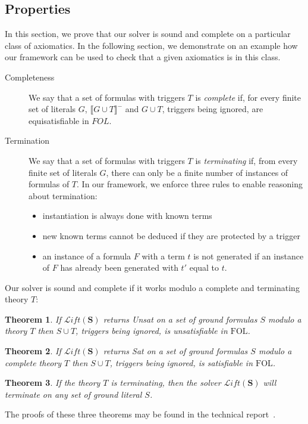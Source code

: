 \documentclass[]{easychair}
\newcommand{\Fm}[1]{\llb #1 \rrb^-}
\newcommand{\Lift}{{\mathcal{L}\mathit{ift}(\mathbf{S})}}
\newcommand{\FOL}{\mathrm{FOL}}
\newcommand{\llb}{\llbracket} \newcommand{\rrb}{\rrbracket}
\newcommand{\beforesub}{\vspace{0cm}}
\newcommand{\aftersub}{\vspace{0cm}}
\newtheorem{theorem}{Theorem}[section]
\begin{document}
\beforesub
\subsection{Properties}
\aftersub

In this section, we prove that our solver is sound and complete on a particular
class of axiomatics. In the following section, we demonstrate on an example how
our framework can be used to check that a given axiomatics is in this class.
\begin{description}
\item[Completeness] We say that a set of formulas with triggers $T$ is
\emph{complete} if, for every finite set of literals $G$,
$\Fm{G\cup T}$ and  $G\cup T$, triggers being ignored, are equisatisfiable in
$FOL$.
\item[Termination] We say that a set of formulas with triggers $T$ is
\emph{terminating} if, from every finite set of literals $G$,
there can only be a finite number of instances of formulas of $T$. In our
framework, we enforce three rules to enable reasoning about termination:
\begin{itemize}
 \item instantiation is always done with known terms
 \item new known terms cannot be deduced if they are protected by a trigger
 \item an instance of a formula $F$ with a term $t$ is not generated if an
instance of $F$ has already been generated with $t'$ equal to $t$.
\end{itemize}
\end{description}
Our solver is sound and complete if it works modulo a complete and terminating
theory $T$:
\begin{theorem} \label{unsat}
If $\Lift$ returns \emph{Unsat} on a set of ground
formulas $S$ modulo a theory $T$ then $S\cup T$, triggers being
ignored, is unsatisfiable in $\FOL$.
\end{theorem}
\begin{theorem} \label{sat}
If $\Lift$ returns \emph{Sat} on a set of ground
formulas $S$ modulo a complete theory $T$ then $S\cup T$, triggers being
ignored, is satisfiable in $\FOL$.
\end{theorem}
\begin{theorem} \label{termination}
If the theory $T$ is terminating, then the solver $\Lift$ will terminate on
any set of ground literal $S$.
\end{theorem}
The proofs of these three theorems may be found in the technical
report~\cite{tech-report}.
\end{document}
